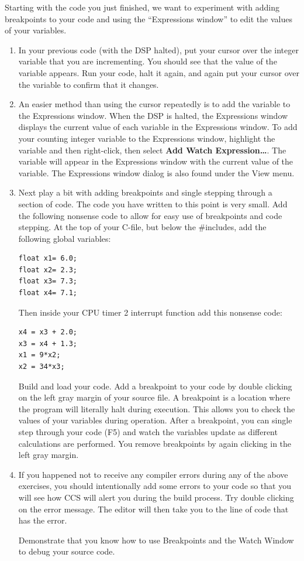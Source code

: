 \documentclass[11pt]{article}
\begin{document}
Starting with the code you just finished, we want to experiment with adding breakpoints to your code and using the “Expressions window” to edit the values of your variables.
%
\begin{enumerate}
    \item In your previous code (with the DSP halted), put your cursor over the integer variable that you are incrementing. You should see that the value of the variable appears. Run your code, halt it again, and again put your cursor over the variable to confirm that it changes.
    \item An easier method than using the cursor repeatedly is to add the variable to the Expressions window. When the DSP is halted, the Expressions window displays the current value of each variable in the Expressions window. To add your counting integer variable to the Expressions window, highlight the variable and then right-click, then select \textbf{Add Watch Expression…}. The variable will appear in the Expressions window with the current value of the variable. The Expressions window dialog is also found under the View menu.
    \item Next play a bit with adding breakpoints and single stepping through a section of code. The code you have written to this point is very small. Add the following nonsense code to allow for easy use of breakpoints and code stepping. At the top of your C-file, but below the \#includes, add the following global variables:
\begin{verbatim}
float x1= 6.0;
float x2= 2.3;
float x3= 7.3;
float x4= 7.1;
\end{verbatim}
        Then inside your CPU timer 2 interrupt function add this nonsense code:
\begin{verbatim}
x4 = x3 + 2.0;
x3 = x4 + 1.3;
x1 = 9*x2;
x2 = 34*x3;
\end{verbatim}
        Build and load your code. Add a breakpoint to your code by double clicking on the left gray margin of your source file. A breakpoint is a location where the program will literally halt during execution. This allows you to check the values of your variables during operation. After a breakpoint, you can single step through your code (F5) and watch the variables update as different calculations are performed. You remove breakpoints by again clicking in the left gray margin.
    \item If you happened not to receive any compiler errors during any of the above exercises, you should intentionally add some errors to your code so that you will see how CCS will alert you during the build process. Try double clicking on the error message. The editor will then take you to the line of code that has the error.
        \begin{checkoff}
                Demonstrate that you know how to use Breakpoints and the Watch Window to debug your source code.
        \end{checkoff}
\end{enumerate}
%
\Ex
\end{document}
